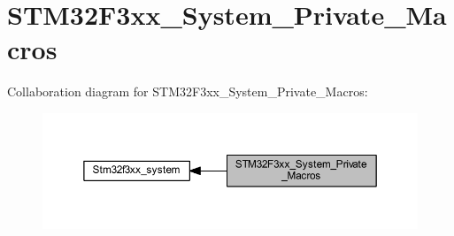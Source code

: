 \hypertarget{group___s_t_m32_f3xx___system___private___macros}{}\section{S\+T\+M32\+F3xx\+\_\+\+System\+\_\+\+Private\+\_\+\+Macros}
\label{group___s_t_m32_f3xx___system___private___macros}
Collaboration diagram for S\+T\+M32\+F3xx\+\_\+\+System\+\_\+\+Private\+\_\+\+Macros\+:\nopagebreak
\begin{figure}[H]
\begin{center}
\leavevmode
\includegraphics[width=350pt]{group___s_t_m32_f3xx___system___private___macros}
\end{center}
\end{figure}
